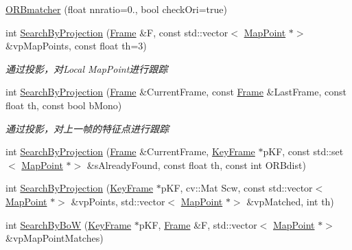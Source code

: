 \begin{DoxyCompactItemize}
\item 
\mbox{\hyperlink{class_o_r_b___s_l_a_m2_1_1_o_r_bmatcher_a6ca536b80e44da0f56fcd35ff8c6a833}{O\+R\+Bmatcher}} (float nnratio=0., bool check\+Ori=true)
\item 
int \mbox{\hyperlink{class_o_r_b___s_l_a_m2_1_1_o_r_bmatcher_ae43d042858a3a3ca4238bb4ca519f196}{Search\+By\+Projection}} (\mbox{\hyperlink{class_o_r_b___s_l_a_m2_1_1_frame}{Frame}} \&F, const std\+::vector$<$ \mbox{\hyperlink{class_o_r_b___s_l_a_m2_1_1_map_point}{Map\+Point}} $\ast$$>$ \&vp\+Map\+Points, const float th=3)
\begin{DoxyCompactList}\small\item\em 通过投影，对\+Local Map\+Point进行跟踪 \end{DoxyCompactList}\item 
int \mbox{\hyperlink{class_o_r_b___s_l_a_m2_1_1_o_r_bmatcher_a0dba0b2bed7d16ca56e27ff4df00f557}{Search\+By\+Projection}} (\mbox{\hyperlink{class_o_r_b___s_l_a_m2_1_1_frame}{Frame}} \&Current\+Frame, const \mbox{\hyperlink{class_o_r_b___s_l_a_m2_1_1_frame}{Frame}} \&Last\+Frame, const float th, const bool b\+Mono)
\begin{DoxyCompactList}\small\item\em 通过投影，对上一帧的特征点进行跟踪 \end{DoxyCompactList}\item 
int \mbox{\hyperlink{class_o_r_b___s_l_a_m2_1_1_o_r_bmatcher_af83a014848a63b5a3b3086386f7a865e}{Search\+By\+Projection}} (\mbox{\hyperlink{class_o_r_b___s_l_a_m2_1_1_frame}{Frame}} \&Current\+Frame, \mbox{\hyperlink{class_o_r_b___s_l_a_m2_1_1_key_frame}{Key\+Frame}} $\ast$p\+KF, const std\+::set$<$ \mbox{\hyperlink{class_o_r_b___s_l_a_m2_1_1_map_point}{Map\+Point}} $\ast$$>$ \&s\+Already\+Found, const float th, const int O\+R\+Bdist)
\item 
int \mbox{\hyperlink{class_o_r_b___s_l_a_m2_1_1_o_r_bmatcher_ac1c0dcdeed922c9a96760aa9a76a2fdb}{Search\+By\+Projection}} (\mbox{\hyperlink{class_o_r_b___s_l_a_m2_1_1_key_frame}{Key\+Frame}} $\ast$p\+KF, cv\+::\+Mat Scw, const std\+::vector$<$ \mbox{\hyperlink{class_o_r_b___s_l_a_m2_1_1_map_point}{Map\+Point}} $\ast$$>$ \&vp\+Points, std\+::vector$<$ \mbox{\hyperlink{class_o_r_b___s_l_a_m2_1_1_map_point}{Map\+Point}} $\ast$$>$ \&vp\+Matched, int th)
\item 
int \mbox{\hyperlink{class_o_r_b___s_l_a_m2_1_1_o_r_bmatcher_a024fe40fa89785df914ef0a59cdf605d}{Search\+By\+BoW}} (\mbox{\hyperlink{class_o_r_b___s_l_a_m2_1_1_key_frame}{Key\+Frame}} $\ast$p\+KF, \mbox{\hyperlink{class_o_r_b___s_l_a_m2_1_1_frame}{Frame}} \&F, std\+::vector$<$ \mbox{\hyperlink{class_o_r_b___s_l_a_m2_1_1_map_point}{Map\+Point}} $\ast$$>$ \&vp\+Map\+Point\+Matches)
$$
\end{DoxyCompactItemize}

